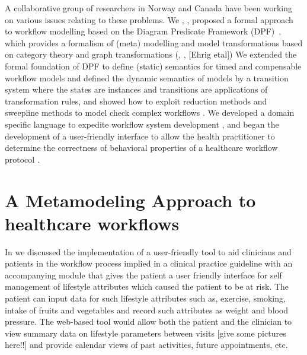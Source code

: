 \documentclass[a4paper]{llncs}
\begin{document}
A collaborative group of researchers in Norway and Canada have been working on various issues relating to these problems.  We \cite{RutleWMFHIES12}, \cite{RutleMacCaullEtAl2012ECMFA}, \cite{lamo2011dpf}
proposed a formal approach to workflow 
modelling based on the Diagram Predicate Framework (DPF)~\cite{Rutle10}, \cite{RutleRLW12} which provides a formalism of (meta) modelling and model transformations based on category theory and graph 
transformations (\cite{Barr05}, \cite{DiskinW08}, [Ehrig etal]) We \cite{WangRutleEtAl2012TASE} extended the formal foundation of DPF to define (static) semantics for timed and compensable workflow models and 
defined the dynamic 
semantics of models by a transition system where the states are instances and transitions are applications of transformation rules, and showed how to exploit reduction methods and 
sweepline methods to model check complex workflows \cite{NWPT13}. We developed a domain specific language to expedite workflow system development \cite{FazleMacCaull2012MODELS}, \cite{RabbiM12} 
and began the development of a 
user-friendly interface to allow the health practitioner to determine the correctness of behavioral properties of a healthcare workflow protocol \cite{Rutle2013317}.  




\section{A Metamodeling Approach to healthcare workflows}

In \cite{CBMS14} we discussed the implementation of a user-friendly tool to aid clinicians and patients in the workflow process implied in a clinical practice guideline with an accompanying 
module that gives the patient a user friendly interface for self management of lifestyle attributes which caused the patient to be at risk.  The patient can input data for such lifestyle 
attributes such as, exercise, smoking, intake of fruits and vegetables and record such attributes as weight and blood pressure.  The web-based tool would allow both the patient and the 
clinician to view summary data on lifestyle parameters between visits [give some pictures here!!] and provide calendar views of past activities, future appointments, etc. 
\end{document}
